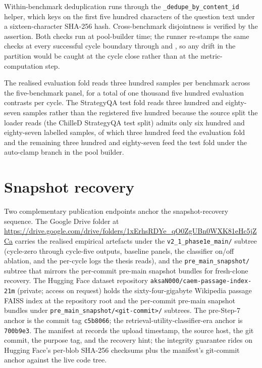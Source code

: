 Within-benchmark deduplication runs through the \verb|_dedupe_by_content_id| helper, which keys on the first five hundred characters of the question text under a sixteen-character SHA-256 hash. Cross-benchmark disjointness is verified by the  assertion. Both checks run at pool-builder time; the runner re-stamps the same checks at every successful cycle boundary through  and , so any drift in the partition would be caught at the cycle close rather than at the metric-computation step.

The realised evaluation fold reads three hundred samples per benchmark across the five-benchmark panel, for a total of one thousand five hundred evaluation contrasts per cycle. The StrategyQA test fold reads three hundred and eighty-seven samples rather than the registered five hundred because the source split the loader reads (the ChilleD StrategyQA test split) admits only six hundred and eighty-seven labelled samples, of which three hundred feed the evaluation fold and the remaining three hundred and eighty-seven feed the test fold under the auto-clamp branch in the pool builder.

\section{Snapshot recovery}
\label{app:repro-snapshot}

Two complementary publication endpoints anchor the snapshot-recovery sequence. The Google Drive folder at \url{https://drive.google.com/drive/folders/1xErhsRDYe_qO0ZgUBn0WXK81eHc5jZCa} carries the realised empirical artefacts under the \texttt{v2\_1\_phase1e\_main/} subtree (cycle-zero through cycle-five outputs, baseline panels, the classifier on/off ablation, and the per-cycle logs the thesis reads), and the \texttt{pre\_main\_snapshot/} subtree that mirrors the per-commit pre-main snapshot bundles for fresh-clone recovery. The Hugging Face dataset repository \verb|aksaN000/caem-passage-index-21m| (private; access on request) holds the sixty-four-gigabyte Wikipedia passage FAISS index at the repository root and the per-commit pre-main snapshot bundles under \verb|pre_main_snapshot/<git-commit>/| subtrees. The pre-Step-7 anchor is the commit tag \verb|c5b8066|; the retrieval-utility-classifier-era anchor is \verb|700b9e3|. The manifest at  records the upload timestamp, the source host, the git commit, the purpose tag, and the recovery hint; the integrity guarantee rides on Hugging Face's per-blob SHA-256 checksums plus the manifest's git-commit anchor against the live code tree.

